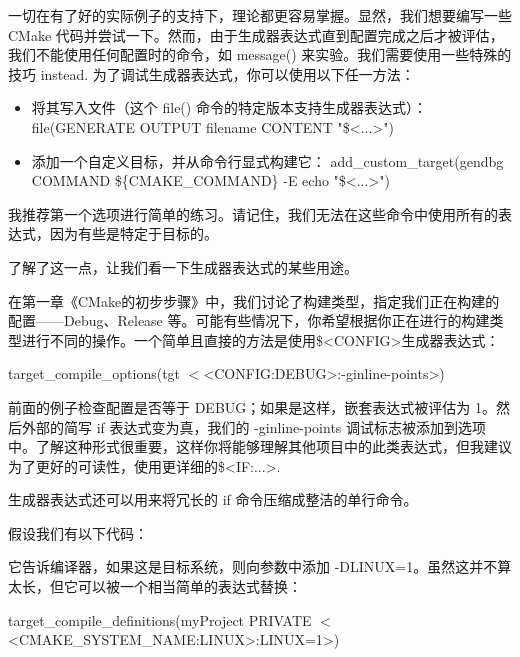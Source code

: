 
一切在有了好的实际例子的支持下，理论都更容易掌握。显然，我们想要编写一些 CMake 代码并尝试一下。然而，由于生成器表达式直到配置完成之后才被评估，我们不能使用任何配置时的命令，如 message() 来实验。我们需要使用一些特殊的技巧 instead. 为了调试生成器表达式，你可以使用以下任一方法：

\begin{itemize}
\item
将其写入文件（这个 file() 命令的特定版本支持生成器表达式）： file(GENERATE OUTPUT filename CONTENT "\$<...>")

\item
添加一个自定义目标，并从命令行显式构建它： add\_custom\_target(gendbg COMMAND \$\{CMAKE\_COMMAND\} -E echo "\$<...>")
\end{itemize}

我推荐第一个选项进行简单的练习。请记住，我们无法在这些命令中使用所有的表达式，因为有些是特定于目标的。

了解了这一点，让我们看一下生成器表达式的某些用途。


在第一章《CMake的初步步骤》中，我们讨论了构建类型，指定我们正在构建的配置——Debug、Release 等。可能有些情况下，你希望根据你正在进行的构建类型进行不同的操作。一个简单且直接的方法是使用\$<CONFIG>生成器表达式：

\begin{shell}
target_compile_options(tgt $<$<CONFIG:DEBUG>:-ginline-points>)
\end{shell}

前面的例子检查配置是否等于 DEBUG；如果是这样，嵌套表达式被评估为 1。然后外部的简写 if 表达式变为真，我们的 -ginline-points 调试标志被添加到选项中。了解这种形式很重要，这样你将能够理解其他项目中的此类表达式，但我建议为了更好的可读性，使用更详细的\$<IF:...>.


生成器表达式还可以用来将冗长的 if 命令压缩成整洁的单行命令。

假设我们有以下代码：


它告诉编译器，如果这是目标系统，则向参数中添加 -DLINUX=1。虽然这并不算太长，但它可以被一个相当简单的表达式替换：

\begin{cmake}
target_compile_definitions(myProject PRIVATE
                           $<$<CMAKE_SYSTEM_NAME:LINUX>:LINUX=1>)
\end{cmake}

